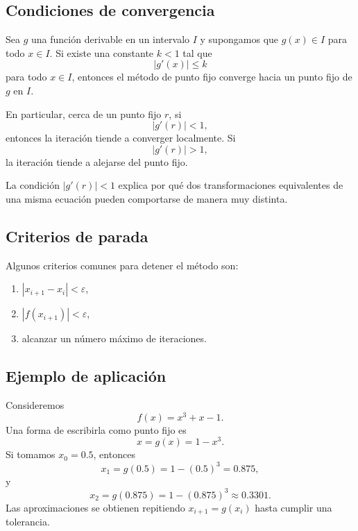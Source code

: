 \documentclass[a4,11pt]{aleph-notas}
\begin{document}
\subsection{Condiciones de convergencia}

\begin{teo}
    Sea $g$ una función derivable en un intervalo $I$ y supongamos que $g(x)\in I$ para todo $x\in I$. Si existe una constante $k<1$ tal que
    \[
        |g'(x)|\leq k
    \]
    para todo $x\in I$, entonces el método de punto fijo converge hacia un punto fijo de $g$ en $I$.
\end{teo}

En particular, cerca de un punto fijo $r$, si
\[
    |g'(r)|<1,
\]
entonces la iteración tiende a converger localmente. Si
\[
    |g'(r)|>1,
\]
la iteración tiende a alejarse del punto fijo.

\begin{advertencia}
    La condición $|g'(r)|<1$ explica por qué dos transformaciones equivalentes de una misma ecuación pueden comportarse de manera muy distinta.
\end{advertencia}


\subsection{Criterios de parada}

Algunos criterios comunes para detener el método son:
\begin{enumerate}
    \item $|x_{i+1}-x_i|<\varepsilon$,
    \item $|f(x_{i+1})|<\varepsilon$,
    \item alcanzar un número máximo de iteraciones.
\end{enumerate}

\subsection{Ejemplo de aplicación}

\begin{ejem}
    Consideremos
    \[
        f(x)=x^3+x-1.
    \]
    Una forma de escribirla como punto fijo es
    \[
        x=g(x)=1-x^3.
    \]
    Si tomamos $x_0=0.5$, entonces
    \[
        x_1=g(0.5)=1-(0.5)^3=0.875,
    \]
    y
    \[
        x_2=g(0.875)=1-(0.875)^3\approx 0.3301.
    \]
    Las aproximaciones se obtienen repitiendo $x_{i+1}=g(x_i)$ hasta cumplir una tolerancia.
\end{ejem}
\end{document}
